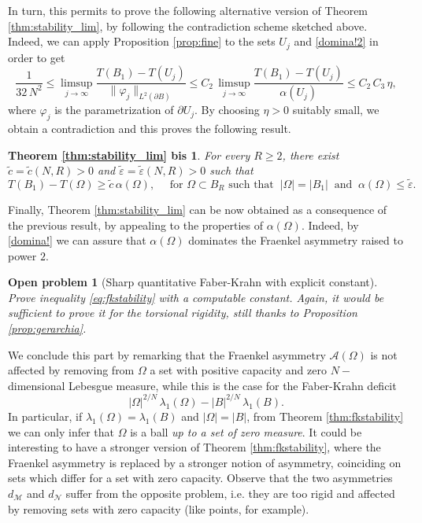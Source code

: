 \documentclass{amsart}
\newtheorem{openpb}{Open problem}
\newtheorem*{bis}{Theorem \ref{thm:stability_lim} bis}
\theoremstyle{definition}
\numberwithin{equation}{section}
\begin{document}
In turn, this permits to prove the following alternative version of Theorem \ref{thm:stability_lim}, by following the contradiction scheme sketched above. Indeed, we can apply Proposition  \ref{prop:fine} to the sets $U_j$ and \eqref{domina!2} in order to get
\[
\frac{1}{32\,N^2}\le \limsup_{j \to \infty}\frac{T(B_1)-T(U_j)}{\|\varphi_j\|_{L^2(\partial B)}}\le C_2\,\limsup_{j \to \infty}\frac{T(B_1)-T(U_j)}{\alpha(U_j)}\le C_2\,C_3\,\eta,
\]
where $\varphi_j$ is the parametrization of $\partial U_j$. By choosing $\eta>0$ suitably small, we obtain a contradiction and this proves the following result.
\begin{bis}
For every $R\ge 2$, there exist $\widetilde c=\widetilde c(N,R)>0$ and $\widetilde\varepsilon=\widetilde \varepsilon(N,R)>0$ such that
\[
T(B_1)- T(\Omega)\ge \widetilde c\,\alpha(\Omega), \quad\mbox{ for $\Omega\subset B_R$ such that }\ |\Omega|=|B_1|\ \mbox{ and }\ \alpha(\Omega)\le \widetilde \varepsilon.
\]
\end{bis}
Finally, Theorem \ref{thm:stability_lim} can be now obtained as a consequence of the previous result, by appealing to the properties of $\alpha(\Omega)$. Indeed, by \eqref{domina!} we can assure that $\alpha(\Omega)$ dominates the Fraenkel asymmetry raised to power $2$.
\begin{openpb}[Sharp quantitative Faber-Krahn with explicit constant]
Prove inequality \eqref{eq:fkstability} with a computable constant. Again, it would be sufficient to prove it for the torsional rigidity, still thanks to Proposition \ref{prop:gerarchia}.
\end{openpb}
We conclude this part by remarking that the Fraenkel asymmetry $\mathcal{A}(\Omega)$ is not affected by removing from $\Omega$ a set with positive capacity and zero $N-$dimensional Lebesgue measure, while this is the case for the Faber-Krahn deficit
\[
|\Omega|^{2/N}\,\lambda_1(\Omega)-|B|^{2/N}\,\lambda_1(B).
\] 
In particular, if $\lambda_1(\Omega)=\lambda_1(B)$ and $|\Omega|=|B|$, from Theorem \ref{thm:fkstability} we can only infer that $\Omega$ is a ball {\it up to a set of zero measure}. It could be interesting to have a stronger version of Theorem \ref{thm:fkstability}, where the Fraenkel asymmetry is replaced by a stronger notion of asymmetry, coinciding on sets which differ for a set with zero capacity. Observe that the two asymmetries $d_\mathcal{M}$ and $d_\mathcal{N}$ suffer from the opposite problem, i.e. they are too rigid and affected by removing sets with zero capacity (like points, for example).
\end{document}
